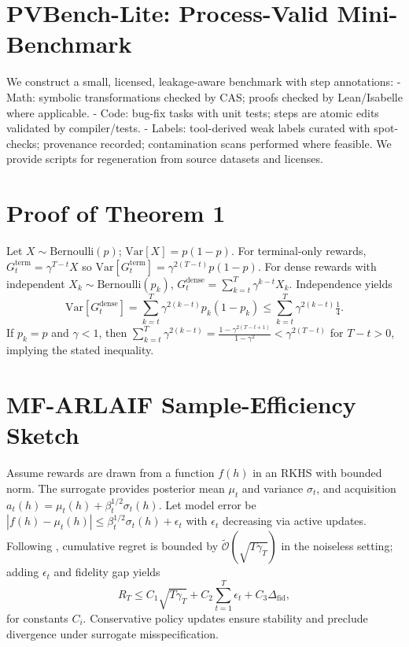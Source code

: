 \documentclass{article}
\begin{document}
\appendix
\section{PVBench-Lite: Process-Valid Mini-Benchmark}
\label{app:pvbench}
We construct a small, licensed, leakage-aware benchmark with step annotations:
- Math: symbolic transformations checked by CAS; proofs checked by Lean/Isabelle where applicable.
- Code: bug-fix tasks with unit tests; steps are atomic edits validated by compiler/tests.
- Labels: tool-derived weak labels curated with spot-checks; provenance recorded; contamination scans performed where feasible.
We provide scripts for regeneration from source datasets and licenses.

\section{Proof of Theorem 1}
\label{app:proof_var}
Let $X\sim\mathrm{Bernoulli}(p)$; $\mathrm{Var}[X]=p(1-p)$. For terminal-only rewards, $G_t^{\mathrm{term}}=\gamma^{T-t} X$ so $\mathrm{Var}[G_t^{\mathrm{term}}]=\gamma^{2(T-t)}p(1-p)$. For dense rewards with independent $X_k\sim\mathrm{Bernoulli}(p_k)$, $G_t^{\mathrm{dense}}=\sum_{k=t}^T \gamma^{k-t} X_k$. Independence yields
\[
\mathrm{Var}[G_t^{\mathrm{dense}}]=\sum_{k=t}^T \gamma^{2(k-t)} p_k(1-p_k) \le \sum_{k=t}^T \gamma^{2(k-t)} \tfrac{1}{4}.
\]
If $p_k=p$ and $\gamma<1$, then $\sum_{k=t}^T \gamma^{2(k-t)} = \frac{1-\gamma^{2(T-t+1)}}{1-\gamma^2} < \gamma^{2(T-t)}$ for $T-t>0$, implying the stated inequality.

\section{MF-ARLAIF Sample-Efficiency Sketch}
\label{app:mf}
Assume rewards are drawn from a function $f(h)$ in an RKHS with bounded norm. The surrogate provides posterior mean $\mu_t$ and variance $\sigma_t$, and acquisition $a_t(h)=\mu_t(h)+\beta_t^{1/2}\sigma_t(h)$. Let model error be $|f(h)-\mu_t(h)|\le \beta_t^{1/2}\sigma_t(h)+\epsilon_t$ with $\epsilon_t$ decreasing via active updates. Following \cite{srinivas2010gaussian}, cumulative regret is bounded by $\tilde{\mathcal{O}}(\sqrt{T\gamma_T})$ in the noiseless setting; adding $\epsilon_t$ and fidelity gap yields
\[
R_T \le C_1 \sqrt{T\gamma_T} + C_2 \sum_{t=1}^T \epsilon_t + C_3 \Delta_{\mathrm{fid}},
\]
for constants $C_i$. Conservative policy updates ensure stability and preclude divergence under surrogate misspecification.
\end{document}

